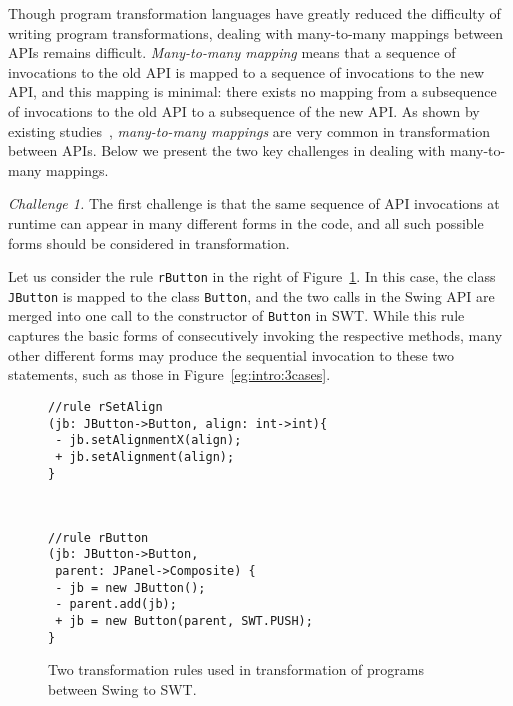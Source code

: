 \documentclass[letterpaper, USenglish]{lipics-v2016}
\newenvironment{smpage}[1]
{\begin{lrbox}{\fmbox}\begin{minipage}{#1}}
{\end{minipage}\end{lrbox}\usebox{\fmbox}}
\newcommand{\code}[1]{\texttt{\footnotesize #1}}
\theoremstyle{plain}
\begin{document}
Though program transformation languages have greatly reduced the difficulty of
writing program transformations, dealing with many-to-many mappings between APIs remains difficult. 
\emph{Many-to-many mapping} means that a
sequence of invocations to the old API is mapped to a sequence of
invocations to the new API, and this mapping is minimal: there exists no 
mapping from a subsequence of invocations to the old API to a
subsequence of the new API. As shown by existing studies~\cite{246,Bartolomei:2009:SAM:2127907.2127914},
\emph{many-to-many mappings} are very common in transformation between APIs.
Below we present the two key challenges in dealing with many-to-many mappings.

\textit{Challenge 1.} The first challenge is
  that the same sequence of API invocations at runtime can appear in many
  different forms in the code, and all such possible forms should be considered in transformation. 
 
Let us consider the rule
\code{rButton} in the right of Figure~\ref{running-rules}. In this case, the class \code{JButton} is mapped to the class \code{Button}, and the two calls in the Swing API are merged into one call to the constructor of \code{Button} in SWT.
While this rule captures the basic forms of consecutively
invoking the respective methods, many other different forms may produce
the sequential invocation to these two statements, such as those in Figure~\ref{eg:intro:3cases}.

\begin{figure}[t]
\begin{center}
\begin{smpage}{0.5\columnwidth}
\begin{lstlisting}[style=patl,frame=none,numbers=none,basicstyle=\scriptsize\ttfamily]
//rule rSetAlign
(jb: JButton->Button, align: int->int){
 - jb.setAlignmentX(align);
 + jb.setAlignment(align);
}
\end{lstlisting}
\end{smpage}
~
\begin{smpage}{0.42\columnwidth}
\begin{lstlisting}[style=patl,frame=none,numbers=none,basicstyle=\scriptsize\ttfamily]
//rule rButton
(jb: JButton->Button, 
 parent: JPanel->Composite) {
 - jb = new JButton();
 - parent.add(jb);
 + jb = new Button(parent, SWT.PUSH);
}
\end{lstlisting}
\end{smpage}
\end{center}
\vspace{-20pt}
\caption{Two transformation rules used in transformation of programs between Swing to SWT.}
\label{running-rules}
\vspace{-10pt}
\end{figure}
\end{document}
